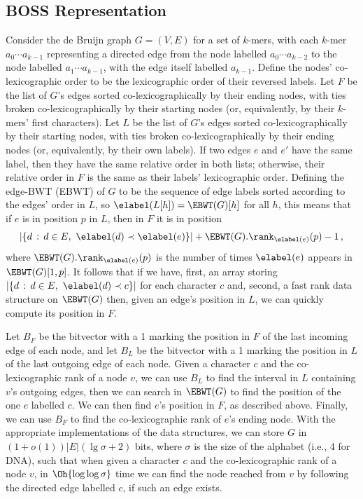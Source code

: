 \documentclass[doctor]{thesis}
\begin{document}
\subsection{BOSS Representation}
\label{subsec:boss}

Consider the de Bruijn graph \(G = (V, E)\) for a set of $k$-mers, with each $k$-mer \(a_0 \cdots a_{k - 1}\) representing a directed edge from the node labelled \(a_0 \cdots a_{k - 2}\) to the node labelled \(a_1 \cdots a_{k - 1}\), with the edge itself labelled \(a_{k - 1}\).  Define the nodes' co-lexicographic order to be the lexicographic order of their reversed labels.  Let $F$ be the list of $G$'s edges sorted co-lexicographically by their ending nodes, with ties broken co-lexicographically by their starting nodes (or, equivalently, by their $k$-mers' first characters).  Let $L$ be the list of $G$'s edges sorted co-lexicographically by their starting nodes, with ties broken co-lexicographically by their ending nodes (or, equivalently, by their own labels).  If two edges $e$ and $e'$ have the same label, then they have the same relative order in both lists; otherwise, their relative order in $F$ is the same as their labels' lexicographic order.  Defining the edge-BWT (EBWT) of $G$ to be the sequence of edge labels sorted according to the edges' order in $L$, so \(\elabel (L [h]) = \EBWT (G) [h]\) for all $h$, this means that if $e$ is in position $p$ in $L$, then in $F$ it is in position
\begin{equation*}
|\{d\,:\,d \in E,\ \elabel (d) \prec \elabel (e)\}| + \EBWT (G).\rank_{\elabel (e)} (p) - 1\,,
\end{equation*}
where \(\EBWT (G).\rank_{\elabel (e)} (p)\) is the number of times $\elabel (e)$ appears in \(\EBWT (G) [1,p]\).  It follows that if we have, first, an array storing \(|\{d\,:\,d \in E,\ \elabel (d) \prec c\}|\) for each character $c$ and, second, a fast rank data structure on \(\EBWT (G)\) then, given an edge's position in $L$, we can quickly compute its position in $F$.

Let $B_F$ be the bitvector with a 1 marking the position in $F$ of the last incoming edge of each node, and let $B_L$ be the bitvector with a 1 marking the position in $L$ of the last outgoing edge of each node.  Given a character $c$ and the co-lexicographic rank of a node $v$, we can use $B_L$ to find the interval in $L$ containing $v$'s outgoing edges, then we can search in \(\EBWT (G)\) to find the position of the one $e$ labelled $c$.  We can then find $e$'s position in $F$, as described above.  Finally, we can use $B_F$ to find the co-lexicographic rank of $e$'s ending node.  With the appropriate implementations of the data structures, we can store $G$ in \((1 + o (1)) |E| (\lg \sigma + 2)\) bits, where $\sigma$ is the size of the alphabet (i.e., 4 for DNA), such that when given a character $c$ and the co-lexicographic rank of a node $v$, in $\Oh{\log \log \sigma}$ time we can find the node reached from $v$ by following the directed edge labelled $c$, if such an edge exists.
\end{document}
